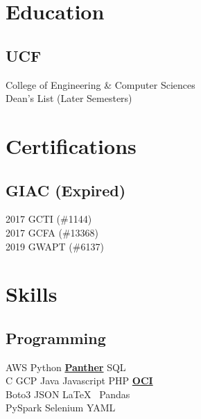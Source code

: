 \documentclass[letterpaper]{deedy-resume} %
\begin{document}
\begin{minipage}[t]{0.33\textwidth} %


\section{Education}
\subsection{UCF}
College of Engineering \& Computer Sciences\\
Dean's List (Later Semesters) \\

\sectionspace %



\section{Certifications}
\subsection{GIAC (Expired)}
2017 GCTI (\#1144) \\
2017 GCFA (\#13368) \\
2019 GWAPT (\#6137) \\
\sectionspace %


\section{Skills}

\subsection{Programming}
AWS \textbullet{} Python \textbullet{} \textbf{\href{https://docs.panther.com/}{Panther}} \textbullet{} SQL \\
C \textbullet{} GCP \textbullet{} Java \textbullet{} Javascript \textbullet{} PHP \textbullet{} \textbf{\href{https://www.oracle.com/cloud/}{OCI}} \\
Boto3 \textbullet{} JSON \textbullet{} \LaTeX\ \textbullet{} Pandas \\
PySpark \textbullet{} Selenium \textbullet{} YAML \\


\end{minipage}
\end{document}
